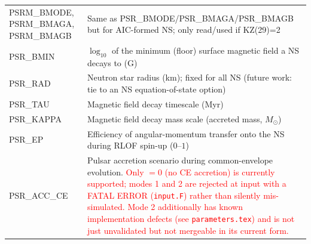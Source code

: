 \begin{longtable}{@{}p{2.3cm}p{12.2cm}}
PSRM\_BMODE, PSRM\_BMAGA, PSRM\_BMAGB & Same as PSR\_BMODE/PSR\_BMAGA/PSR\_BMAGB but for AIC-formed NS; only read/used if KZ(29)=2 \\
PSR\_BMIN & $\log_{10}$ of the minimum (floor) surface magnetic field a NS decays to (G) \\
PSR\_RAD & Neutron star radius (km); fixed for all NS (future work: tie to an NS equation-of-state option) \\
PSR\_TAU & Magnetic field decay timescale (Myr) \\
PSR\_KAPPA & Magnetic field decay mass scale (accreted mass, $M_\odot$) \\
PSR\_EP & Efficiency of angular-momentum transfer onto the NS during RLOF spin-up ($0$--$1$) \\
PSR\_ACC\_CE & Pulsar accretion scenario during common-envelope evolution. \textcolor{red}{Only $=0$ (no CE accretion) is currently supported; modes 1 and 2 are rejected at input with a FATAL ERROR (\texttt{input.F}) rather than silently mis-simulated. Mode 2 additionally has known implementation defects (see \texttt{parameters.tex}) and is not just unvalidated but not mergeable in its current form.} \\
\end{longtable}


